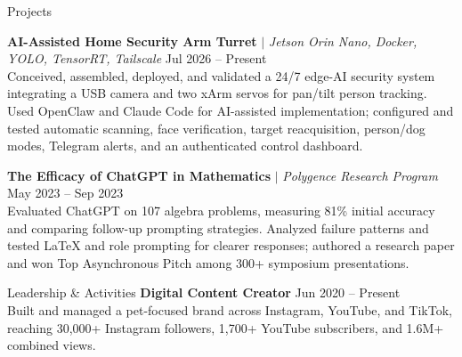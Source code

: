 \documentclass{resume}
\begin{document}
\begin{rSection}{Projects}
\vspace{-1.1em}
\item \textbf{AI-Assisted Home Security Arm Turret} $\mid$ \textit{Jetson Orin Nano, Docker, YOLO, TensorRT, Tailscale} \hfill Jul 2026 -- Present\\
Conceived, assembled, deployed, and validated a 24/7 edge-AI security system integrating a USB camera and two xArm servos for pan/tilt person tracking. Used OpenClaw and Claude Code for AI-assisted implementation; configured and tested automatic scanning, face verification, target reacquisition, person/dog modes, Telegram alerts, and an authenticated control dashboard.

\item \textbf{The Efficacy of ChatGPT in Mathematics} $\mid$ \textit{Polygence Research Program} \hfill May 2023 -- Sep 2023\\
Evaluated ChatGPT on 107 algebra problems, measuring 81\% initial accuracy and comparing follow-up prompting strategies. Analyzed failure patterns and tested LaTeX and role prompting for clearer responses; authored a research paper and won Top Asynchronous Pitch among 300+ symposium presentations.
\end{rSection}

\begin{rSection}{Leadership \& Activities}
\textbf{Digital Content Creator} \hfill Jun 2020 -- Present\\
Built and managed a pet-focused brand across Instagram, YouTube, and TikTok, reaching 30,000+ Instagram followers, 1,700+ YouTube subscribers, and 1.6M+ combined views.
\end{rSection}
\end{document}
